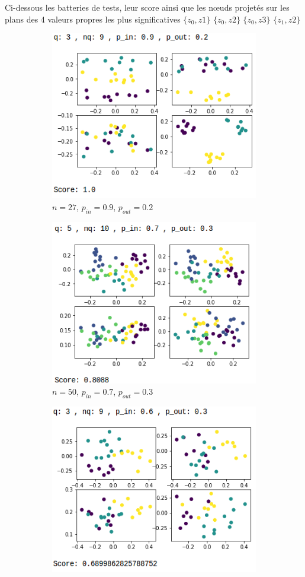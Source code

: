 Ci-dessous les batteries de tests, leur score ainsi que les nœuds projetés sur les plans des 4 valeurs propres les plus significatives
$\{z_0,z1\}$
$\{z_0,z2\}$
$\{z_0,z3\}$
$\{z_1,z2\}$
\begin{figure}[H]
	\begin{subfigure}{.5\textwidth}
		\centering
		\includegraphics[scale=0.58]{static/q3_nq9_pin09_pout02.png}
		\caption{$n=27$, $p_{in}=0.9$, $p_{out}=0.2$}
		\label{n27pin09pout02}
	\end{subfigure}
	\begin{subfigure}{.5\textwidth}
		\centering
		\includegraphics[scale=0.58]{static/q5_nq10_pin07_pout03.png}
		\caption{$n=50$, $p_{in}=0.7$, $p_{out}=0.3$}
		\label{n50pin07pout03}
	\end{subfigure}
	\begin{subfigure}{.5\textwidth}
		\centering
		\includegraphics[scale=0.58]{static/q3_nq9_pin06_pout03.png}

\end{subfigure}
\end{figure}
